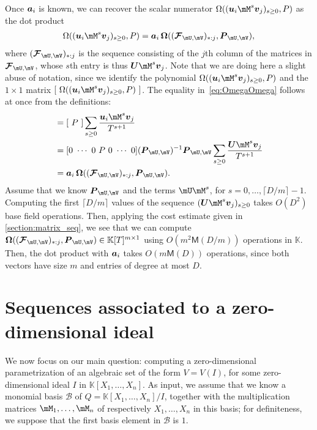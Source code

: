 \documentclass[12pt]{article}
\newcommand{\mat}[1]{\bm{\MakeUppercase{#1}}} %
\newcommand{\row}[1]{\bm{\MakeLowercase{#1}}} %
\newcommand{\col}[1]{\bm{\MakeLowercase{#1}}} %
\newcommand{\seq}{\mat{\mathcal{F}}} %
\newcommand{\basis}{\mathscr{B}}
\newcommand{\minpoly}{P}
\def\M {\ensuremath{\mathsf{M}}}
\def\K{\mathbb{K}}
\def\K {\ensuremath{\mathbb{K}}}
\begin{document}
Once $\row{a}_i$ is known, we can recover the scalar numerator
$\Omega((\row{u}_i \mM^s \col{v}_j)_{s \ge 0}, \minpoly)$ as
the dot product
\begin{align}\label{eq:OmegaOmega}
\Omega((\row{u}_i \mM^s \col{v}_j)_{s \ge 0}, \minpoly) = \row{a}_i\, \mat{\Omega}( (\seq_{\mU,\mV})_{*:j}, \mat{P}_{\mU,\mV}),  
\end{align}
where $(\seq_{\mU,\mV})_{*:j}$ is the sequence consisting of the $j$th
column of the matrices in $\seq_{\mU,\mV}$, whose $s$th entry is thus
$\mat{U} \mM^s \col{v}_j$. Note that we are doing here a slight abuse of
notation, since we identify the polynomial $ \Omega((\row{u}_i \mM^s
\col{v}_j)_{s \ge 0}, \minpoly)$ and the $1 \times 1$ matrix $[~
  \Omega((\row{u}_i \mM^s \col{v}_j)_{s \ge 0}, \minpoly)~]$.
The equality in~\eqref{eq:OmegaOmega} follows at once from the definitions:
\begin{align*}
[~ \Omega((\row{u}_i \mM^s \col{v}_j)_{s \ge 0}, \minpoly)~]  &= [~\minpoly~] \sum_{s \ge 0} \frac{\row{u}_i \mM^s \col{v}_j}{T^{s+1}}\\
&=  [0~\cdots~0~\minpoly~0~\cdots~0] (\mat{P}_{\mU,\mV})^{-1} \mat{P}_{\mU,\mV} \sum_{s \ge 0} \frac{\mat{U} \mM^s \col{v}_j}{T^{s+1}}\\
&=  \row{a}_i\, \mat{\Omega}( (\seq_{\mU,\mV})_{*:j}, \mat{P}_{\mU,\mV}).
\end{align*}
Assume that we know $\mat{P}_{\mU,\mV}$ and the terms $\mU \mM^s$, for
$s=0,\dots,\lceil D/m \rceil-1$. Computing the first $\lceil D/m
\rceil$ values of the sequence $(\mat{U} \mM^s \col{v}_j)_{s\ge 0}$ takes
$O(D^2)$ base field operations. Then, applying the cost estimate given
in \cref{section:matrix_seq}, we see that we can compute $\mat{\Omega}(
(\seq_{\mU,\mV})_{*:j}, \mat{P}_{\mU,\mV}) \in \K[T]^{m \times 1}$
using $O(m^2 \M(D/m))$ operations in $\K$. Then, the dot product with
$\row{a}_i$ takes $O(m \M(D))$ operations, since both vectors have
size $m$ and entries of degree at most $D$.


\section{Sequences associated to a zero-dimensional ideal}

We now focus on our main question: computing a zero-dimensional
parametrization of an algebraic set of the form $V=V(I)$, for some
zero-dimensional ideal $I$ in $\K[X_1,\dots,X_n]$. As input, we assume
that we know a monomial basis $\basis$ of $Q=\K[X_1,\dots,X_n]/I$,
together with the multiplication matrices $\mM_1,\dots,\mM_n$ of
respectively $X_1,\dots,X_n$ in this basis; for definiteness, we
suppose that the first basis element in $\basis$ is $1$.
\end{document}
